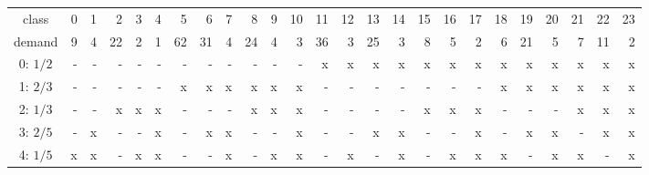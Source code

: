 \begin{tabular*}{1\linewidth}{@{\extracolsep{\fill}} c|rrrrrrrrrrrrrrrrrrrrrrrr }
class	&0	&1	&2	&3	&4	&5	&6	&7	&8	&9	&10	&11	&12	&13	&14	&15	&16	&17	&18	&19	&20	&21	&22	&23\\
demand	&9	&4	&22	&2	&1	&62	&31	&4	&24	&4	&3	&36	&3	&25	&3	&8	&5	&2	&6	&21	&5	&7	&11	&2\\
  \hline                        
0: $1/2$	&-	&-	&-	&-	&-	&-	&-	&-	&-	&-	&-	&x	&x	&x	&x	&x	&x	&x	&x	&x	&x	&x	&x	&x\\
1: $2/3$	&-	&-	&-	&-	&-	&x	&x	&x	&x	&x	&x	&-	&-	&-	&-	&-	&-	&-	&x	&x	&x	&x	&x	&x\\
2: $1/3$	&-	&-	&x	&x	&x	&-	&-	&-	&x	&x	&x	&-	&-	&-	&-	&x	&x	&x	&-	&-	&-	&x	&x	&x\\
3: $2/5$	&-	&x	&-	&-	&x	&-	&x	&x	&-	&-	&x	&-	&-	&x	&x	&-	&-	&x	&-	&x	&x	&-	&x	&x\\
4: $1/5$	&x	&x	&-	&x	&x	&-	&-	&x	&-	&x	&x	&-	&x	&-	&x	&-	&x	&x	&x	&-	&x	&x	&-	&x\\
\end{tabular*}
